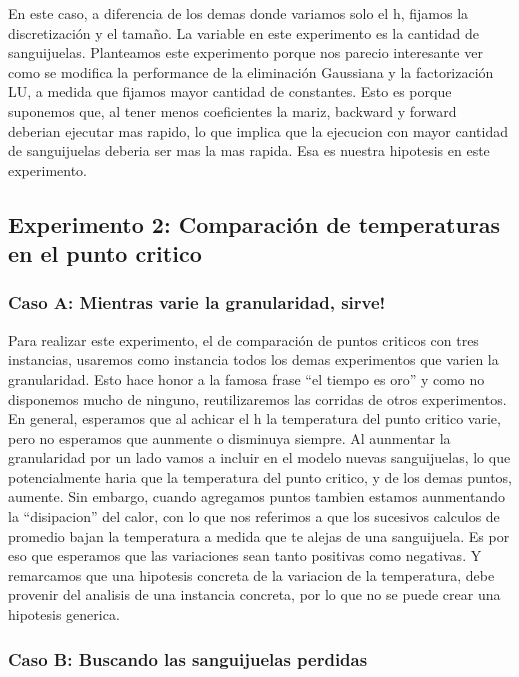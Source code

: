 En este caso, a diferencia de los demas donde variamos solo el h, fijamos la discretizaci\'on y el tama\~no.
La variable en este experimento 
es la cantidad de sanguijuelas. Planteamos este experimento porque nos parecio interesante ver como se modifica 
la performance de la eliminaci\'on 
Gaussiana y la factorizaci\'on LU, a medida que fijamos mayor cantidad de constantes. Esto es porque 
suponemos que, al tener menos coeficientes la mariz, backward y forward deberian ejecutar mas rapido, 
lo que implica que la ejecucion con mayor cantidad de sanguijuelas deberia ser mas la mas rapida.
Esa es nuestra hipotesis en este experimento.

\subsection{Experimento 2: Comparaci\'on de temperaturas en el punto critico}

\subsubsection{Caso A: \textexclamdown Mientras varie la granularidad, sirve!}

Para realizar este experimento, el de comparaci\'on de puntos criticos con tres instancias, usaremos como instancia todos los demas experimentos que varien la granularidad.
Esto hace honor a la famosa frase ``el tiempo es oro'' y como no disponemos mucho de ninguno, 
reutilizaremos las corridas de otros experimentos. En general, esperamos que al achicar el h la 
temperatura del punto critico varie, pero no esperamos que aunmente o disminuya siempre. Al 
aunmentar la granularidad por un lado vamos a incluir en el modelo nuevas sanguijuelas, lo que
potencialmente haria que la temperatura del punto critico, y de los demas puntos, aumente. Sin embargo,
cuando agregamos puntos tambien estamos aunmentando la ``disipacion'' del calor, con lo que 
nos referimos a que los sucesivos calculos de promedio bajan la temperatura a medida que te alejas de 
una sanguijuela. Es por eso que esperamos que las variaciones sean tanto positivas como negativas. Y
remarcamos que una hipotesis concreta de la variacion de la temperatura, debe provenir del analisis de 
una instancia concreta, por lo que no se puede crear una hipotesis generica.

\subsubsection{Caso B: Buscando las sanguijuelas perdidas}

